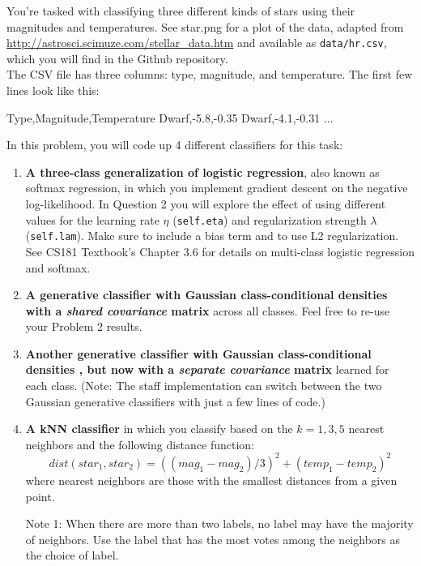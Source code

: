 \documentclass[submit]{harvardml}
\begin{document}
\begin{problem}

You're tasked with classifying three different kinds of stars using their magnitudes and temperatures. See star.png for a plot of
the data, adapted from
\url{http://astrosci.scimuze.com/stellar_data.htm} and available as
\verb|data/hr.csv|, which you will find in the Github repository. \\

The CSV file has three columns: type, magnitude, and temperature. The
first few lines look like this:
\begin{csv}
Type,Magnitude,Temperature
Dwarf,-5.8,-0.35
Dwarf,-4.1,-0.31
...
\end{csv}

In this problem, you will code up 4 different classifiers for this task:
\begin{enumerate}[label=\alph*)]

\item \textbf{A three-class generalization of logistic regression}, also
  known as softmax regression, in which you implement gradient descent on the negative log-likelihood. In Question 2 you will explore the effect of using different values for the learning rate $\eta$ (\texttt{self.eta}) and
  regularization strength $\lambda$ (\texttt{self.lam}).  Make sure to include a bias term and to
  use L2 regularization. See CS181 Textbook's Chapter 3.6 for details on multi-class
  logistic regression and softmax.
  
\item \textbf{A generative classifier with Gaussian class-conditional
  densities with a \textit{shared covariance} matrix} across all classes. 
  Feel free to re-use your Problem 2 results.
\item \textbf{Another generative classifier with Gaussian class-conditional densities , but now 
with a \textit{separate covariance} matrix} learned for each class. (Note: 
The staff implementation can switch between the two Gaussian generative classifiers with just a
few lines of code.)

\item \textbf{A kNN classifier} in which you classify based on the $k=1,3,5$ nearest neighbors and the following distance function: $$dist(star_1, star_2) = ((mag_1 - mag_2)/3)^2 + (temp_1 - temp_2)^2$$
where nearest neighbors are those with the smallest distances from a given point.

  Note 1: When there are more than two labels, no label may have the
  majority of neighbors.  Use the label that has the most votes among
  the neighbors as the choice of label. 


\end{enumerate}
\end{problem}
\end{document}
